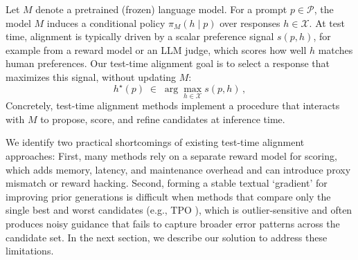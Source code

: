 \documentclass[11pt]{article}
\theoremstyle{plain}
\theoremstyle{definition}
\theoremstyle{remark}
\newcommand{\budget}{B}
\newcommand{\batchN}{N}
\begin{document}

Let \(M\) denote a pretrained (frozen) language model. For a prompt \(p\in\mathcal{P}\), the model \(M\) induces a conditional policy \(\pi_{M}(h\mid p)\) over responses \(h\in\mathcal{X}\). At test time, alignment is typically driven by a scalar preference signal \(s(p,h)\), for example from a reward model or an LLM judge, which scores how well \(h\) matches human preferences. Our test-time alignment goal is to select a response that maximizes this signal, without updating \(M\):
\[
    h^\star(p)\;\in\;\arg\max_{h\in\mathcal{X}} s(p,h)\,,
\]
Concretely, test-time alignment methods implement a procedure that interacts with \(M\) to propose, score, and refine candidates at inference time.


We identify two practical shortcomings of existing test-time alignment approaches: First, many methods rely on a separate reward model for scoring, which adds memory, latency, and maintenance overhead and can introduce proxy mismatch or reward hacking. Second, forming a stable textual `gradient' for improving prior generations is difficult when methods that compare only the single best and worst candidates (e.g., TPO \cite{litest}), which is outlier‑sensitive and often produces noisy guidance that fails to capture broader error patterns across the candidate set. In the next section, we describe our solution to address these limitations.
\end{document}

